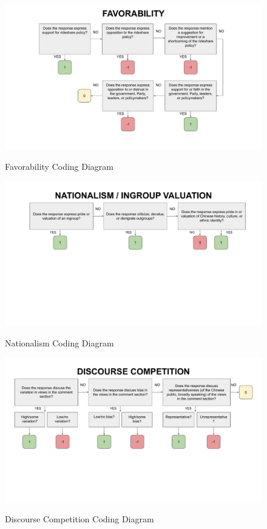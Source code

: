 \documentclass[11pt]{article}
\begin{document}
\begin{figure}
  \centering
  \caption{Favorability Coding Diagram}
  \vspace{1em}
  \includegraphics[width=\textwidth]{figures/coding_diagrams/favorability.pdf}
  \label{favorability}
\end{figure}

\begin{figure}
  \centering
  \caption{Nationalism Coding Diagram}
  \vspace{1em}
  \includegraphics[width=\textwidth]{figures/coding_diagrams/nationalism.pdf}
  \label{nationalism}
\end{figure}

\begin{figure}
  \centering
  \caption{Discourse Competition Coding Diagram}
  \vspace{1em}
  \includegraphics[width=\textwidth]{figures/coding_diagrams/discourse_competition.pdf}
  \label{discourse_competition}
\end{figure}

\newpage



\end{document}
